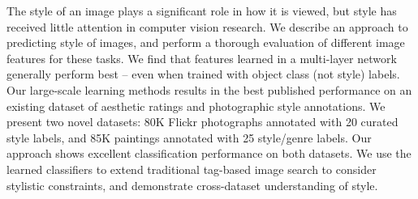 The style of an image plays a significant role in how it is viewed, but style has received little attention in computer vision research.
We describe an approach to predicting style of images, and perform a thorough evaluation of different image features for these tasks.
We find that features learned in a multi-layer network generally perform best -- even when trained with object class (not style) labels.
Our large-scale learning methods results in the best published performance on an existing dataset of aesthetic ratings and photographic style annotations.
We present two novel datasets: 80K Flickr photographs annotated with 20 curated style labels, and 85K paintings annotated with 25 style/genre labels.
Our approach shows excellent classification performance on both datasets.
We use the learned classifiers to extend traditional tag-based image search to consider stylistic constraints, and demonstrate cross-dataset understanding of style.
